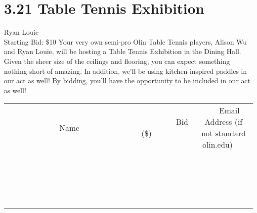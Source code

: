 \documentclass[11pt]{article}
\begin{document}
\section*{3.21 Table Tennis Exhibition}
Ryan Louie
\\
Starting Bid: \$10
\newline
Your very own semi-pro Olin Table Tennis players, Alison Wu and Ryan Louie, will be hosting a Table Tennis Exhibition in the Dining Hall. Given the sheer size of the ceilings and flooring, you can expect something nothing short of amazing.  In addition, we'll be using kitchen-inspired paddles in our act as well!  By bidding, you'll have the opportunity to be included in our act as well!
\\[3ex]
\begin{tabular}{c c c}
~~~~~~~~~~~~~Name~~~~~~~~~~~~~ & ~~~~~~~~~Bid (\$)~~~~~~~~~  & ~~~Email Address (if not standard olin.edu)~~~\\
 & & \\
\hline
 & & \\
\hline
 & & \\
\hline
 & & \\
\hline
 & & \\
\hline
 & & \\
\hline
 & & \\
\hline
 & & \\
\hline
 & & \\
\hline
 & & \\
\hline
 & & \\
\hline
 & & \\
\hline
 & & \\
\hline
 & & \\
\hline
 & & \\
\hline
 & & \\
\hline
 & & \\
\hline
 & & \\
\hline
 & & \\
\hline
\end{tabular}
\newpage
\end{document}
